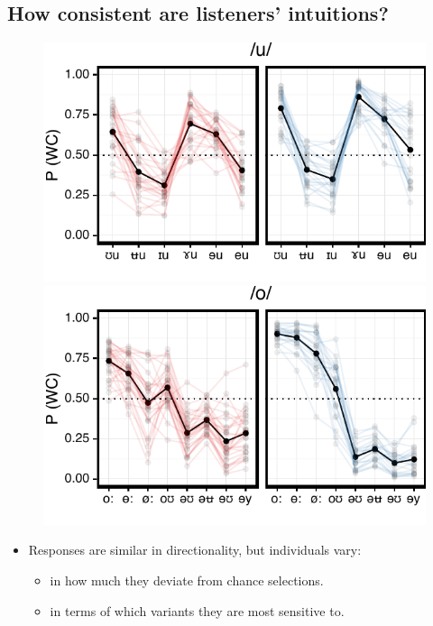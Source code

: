 \documentclass[a0,portrait]{a0poster}
\begin{document}
\begin{multicols}{3}
\subsection*{How consistent are listeners' intuitions?}
\begin{figure}[H]
\centering
\hspace*{-2cm}
\includegraphics[scale=2]{u_clust.pdf}
\hspace*{-2cm}
\includegraphics[scale=2]{o_clust.pdf}
\end{figure}
\vspace*{-1cm}
\begin{itemize}
\item{Responses are similar in directionality, but individuals vary:\begin{itemize}\item{in how much they deviate from chance selections.} \item{in terms of which variants they are most sensitive to.}\end{itemize}}

\end{itemize}
\end{multicols}
\end{document}
